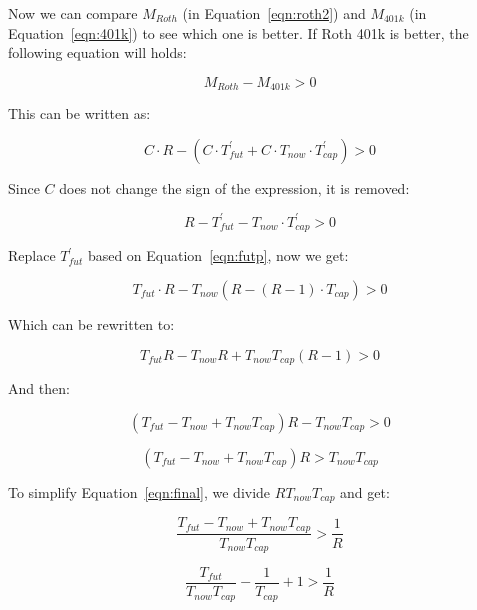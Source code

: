 \documentclass[twocolumn]{article}
\begin{document}
Now we can compare $M_{Roth}$ (in Equation~\ref{eqn:roth2}) and $M_{401k}$ (in
Equation~\ref{eqn:401k}) to see which one is better. If Roth
401k is better, the following equation will holds:

\begin{equation}
  M_{Roth} - M_{401k} > 0
\end{equation}

This can be written as:

\begin{equation}
  C \cdot R - (C \cdot T_{fut}^{\prime} + C \cdot T_{now} \cdot T_{cap}^{\prime}) > 0 \label{eqn:cmp}
\end{equation}

Since $C$ does not change the sign of the expression, it is removed:

\begin{equation}
  R - T_{fut}^{\prime} - T_{now} \cdot T_{cap}^{\prime} > 0 \label{eqn:cmp2}
\end{equation}

Replace $T_{fut}^{\prime}$ based on Equation~\ref{eqn:futp}, now we get:

\begin{equation}
  T_{fut} \cdot R - T_{now} (R - (R - 1) \cdot T_{cap}) > 0
\end{equation}

Which can be rewritten to:

\begin{equation}
  T_{fut} R - T_{now} R + T_{now} T_{cap} (R - 1) > 0
\end{equation}

And then:

\begin{equation}
  (T_{fut} - T_{now} + T_{now} T_{cap})R - T_{now} T_{cap} > 0
\end{equation}

\begin{equation}
  (T_{fut} - T_{now} + T_{now} T_{cap})R > T_{now} T_{cap} \label{eqn:final}
\end{equation}

To simplify Equation~\ref{eqn:final}, we divide $R T_{now} T_{cap}$ and get:

\begin{equation}
  \frac{T_{fut} - T_{now} + T_{now}T_{cap}}{T_{now} T_{cap}} > \frac{1}{R}
\end{equation}

\begin{equation}
  \frac{T_{fut}}{T_{now}T_{cap}} - \frac{1}{T_{cap}} + 1 > \frac{1}{R}
\end{equation}
\end{document}
